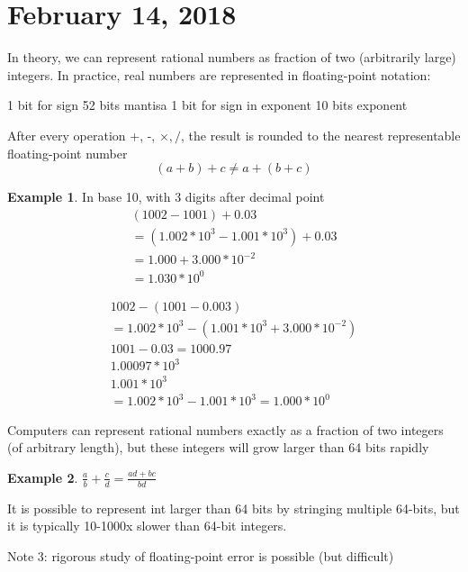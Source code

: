 \documentclass{article}
\theoremstyle{plain}
\theoremstyle{definition}
\newtheorem{eg}{Example}
\begin{document}
\section{February 14, 2018}
In theory, we can represent rational numbers as fraction of two
(arbitrarily large) integers. In practice, real numbers are represented in
floating-point notation:

1 bit for sign
52 bits mantisa
1 bit for sign in exponent
10 bits exponent

After every operation +, -, $\times, /$, the result is rounded to the
nearest representable floating-point number
\begin{equation*}
    (a+b) + c \ne a + (b+c)
\end{equation*}

\begin{eg}
    In base 10, with 3 digits after decimal point
    \begin{align*}
        (1002 - 1001) + 0.03\\
        = (1.002 * 10^3 - 1.001 * 10^3) + 0.03\\
        = 1.000 + 3.000*10^{-2}\\
        = 1.030 * 10^0
    \end{align*}

    \begin{align*}
        1002 - (1001 - 0.003)\\
        = 1.002 * 10^3 - (1.001 * 10^3 + 3.000*10^{-2})\\
        1001 - 0.03 = 1000.97\\
        1.00097 * 10^3\\
        1.001 * 10^3\\
        = 1.002*10^3 - 1.001*10^3
        = 1.000 * 10^0
    \end{align*}
\end{eg}

Computers can represent rational numbers exactly as a fraction of
two integers (of arbitrary length), but these integers will grow larger
than 64 bits rapidly

\begin{eg}
    $\frac{a}{b} + \frac{c}{d} = \frac{ad+bc}{bd}$
\end{eg}

It is possible to represent int larger than 64 bits by stringing multiple
64-bits, but it is typically 10-1000x slower than 64-bit integers.

Note 3: rigorous study of floating-point error is possible (but difficult)
\end{document}
